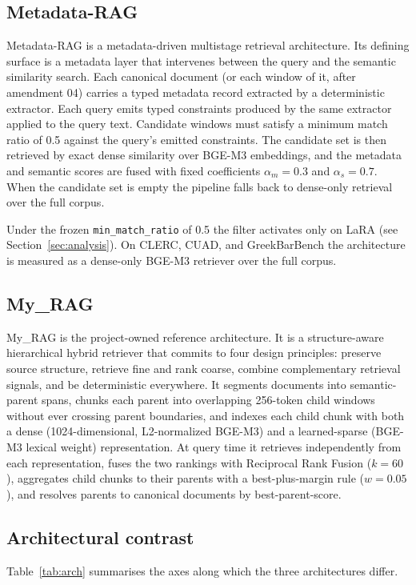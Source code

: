 \documentclass[11pt,a4paper]{article}
\begin{document}
\subsection{Metadata-RAG}
Metadata-RAG is a metadata-driven multistage retrieval
architecture. Its defining surface is a metadata layer that
intervenes between the query and the semantic similarity search.
Each canonical document (or each window of it, after amendment 04)
carries a typed metadata record extracted by a deterministic
extractor. Each query emits typed constraints produced by the same
extractor applied to the query text. Candidate windows must satisfy
a minimum match ratio of \num{0.5} against the query's emitted
constraints. The candidate set is then retrieved by exact dense
similarity over BGE-M3 embeddings, and the metadata and semantic
scores are fused with fixed coefficients $\alpha_m = 0.3$ and
$\alpha_s = 0.7$. When the candidate set is empty the pipeline
falls back to dense-only retrieval over the full corpus.

Under the frozen \texttt{min\_match\_ratio} of \num{0.5} the filter
activates only on LaRA (see Section~\ref{sec:analysis}). On CLERC,
CUAD, and GreekBarBench the architecture is measured as a dense-only
BGE-M3 retriever over the full corpus.

\subsection{My\_RAG}
My\_RAG is the project-owned reference architecture. It is a
structure-aware hierarchical hybrid retriever that commits to four
design principles: preserve source structure, retrieve fine and
rank coarse, combine complementary retrieval signals, and be
deterministic everywhere. It segments documents into
semantic-parent spans, chunks each parent into overlapping
\num{256}-token child windows without ever crossing parent
boundaries, and indexes each child chunk with both a dense
(\num{1024}-dimensional, L2-normalized BGE-M3) and a learned-sparse
(BGE-M3 lexical weight) representation. At query time it retrieves
independently from each representation, fuses the two rankings with
Reciprocal Rank Fusion ($k=60$), aggregates child chunks to their
parents with a best-plus-margin rule ($w=0.05$), and resolves
parents to canonical documents by best-parent-score.

\subsection{Architectural contrast}
Table~\ref{tab:arch} summarises the axes along which the three
architectures differ.
\end{document}
